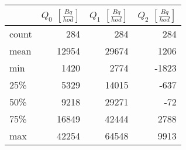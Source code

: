 \begin{tabular}{lrrr}
\toprule
{} &  $Q_0$ $\left[\si{\frac{Bq}{hod}}\right]$ &  $Q_1$ $\left[\si{\frac{Bq}{hod}}\right]$ &  $Q_2$ $\left[\si{\frac{Bq}{hod}}\right]$ \\
\midrule
count &                                       284 &                                       284 &                                       284 \\
mean  &                                     12954 &                                     29674 &                                      1206 \\
min   &                                      1420 &                                      2774 &                                     -1823 \\
25\%   &                                      5329 &                                     14015 &                                      -637 \\
50\%   &                                      9218 &                                     29271 &                                       -72 \\
75\%   &                                     16849 &                                     42444 &                                      2788 \\
max   &                                     42254 &                                     64548 &                                      9913 \\
\bottomrule
\end{tabular}
